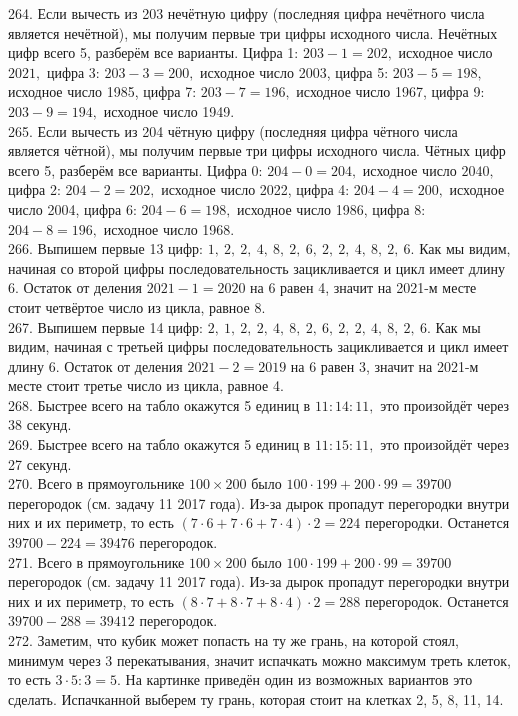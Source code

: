 \documentclass[12pt]{article}
\begin{document}
264. Если вычесть из 203 нечётную цифру (последняя цифра нечётного числа является нечётной), мы получим первые три цифры исходного числа. Нечётных цифр всего 5, разберём все варианты. Цифра 1: $203-1=202,$ исходное число $2021,$ цифра 3: $203-3=200,$ исходное число 2003, цифра 5: $203-5=198,$ исходное число 1985, цифра 7: $203-7=196,$ исходное число 1967, цифра 9: $203-9=194,$ исходное число 1949.\\
265. Если вычесть из 204 чётную цифру (последняя цифра чётного числа является чётной), мы получим первые три цифры исходного числа. Чётных цифр всего 5, разберём все варианты. Цифра 0: $204-0=204,$ исходное число $2040,$ цифра 2: $204-2=202,$ исходное число 2022, цифра 4: $204-4=200,$ исходное число 2004, цифра 6: $204-6=198,$ исходное число 1986, цифра 8: $204-8=196,$ исходное число 1968.\\
266. Выпишем первые 13 цифр: $1,\ 2,\ 2,\ 4,\ 8,\ 2,\ 6,\ 2,\ 2,\ 4,\ 8,\ 2,\ 6.$ Как мы видим, начиная со второй цифры последовательность зацикливается и цикл имеет длину 6. Остаток от деления $2021-1=2020$ на 6 равен 4, значит на 2021-м месте стоит четвёртое число из цикла, равное 8.\\
267. Выпишем первые 14 цифр: $2,\ 1,\ 2,\ 2,\ 4,\ 8,\ 2,\ 6,\ 2,\ 2,\ 4,\ 8,\ 2,\ 6.$ Как мы видим, начиная с третьей цифры последовательность зацикливается и цикл имеет длину 6. Остаток от деления $2021-2=2019$ на 6 равен 3, значит на 2021-м месте стоит третье число из цикла, равное 4.\\
268. Быстрее всего на табло окажутся 5 единиц в $11:14:11,$ это произойдёт через 38 секунд.\\
269. Быстрее всего на табло окажутся 5 единиц в $11:15:11,$ это произойдёт через 27 секунд.\\
270. Всего в прямоугольнике $100\times200$ было $100\cdot199+200\cdot99=39700$ перегородок (см. задачу 11 2017 года). Из-за дырок пропадут перегородки внутри них и их периметр, то есть $(7\cdot6+7\cdot6+7\cdot4)\cdot2=224$ перегородки. Останется $39700-224=39476$ перегородок.\\
271. Всего в прямоугольнике $100\times200$ было $100\cdot199+200\cdot99=39700$ перегородок (см. задачу 11 2017 года). Из-за дырок пропадут перегородки внутри них и их периметр, то есть $(8\cdot7+8\cdot7+8\cdot4)\cdot2=288$ перегородок. Останется $39700-288=39412$ перегородок.\\
272. Заметим, что кубик может попасть на ту же грань, на которой стоял, минимум через 3 перекатывания, значит испачкать можно максимум треть клеток, то есть $3\cdot5:3=5.$ На картинке приведён один из возможных вариантов это сделать. Испачканной выберем ту грань, которая стоит на клетках 2, 5, 8, 11, 14.
\end{document}
